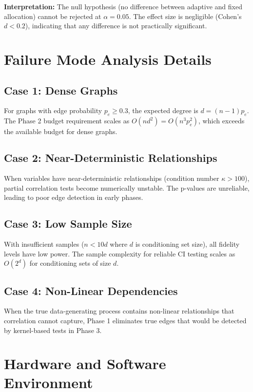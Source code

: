 \documentclass{article}
\begin{document}
\textbf{Interpretation:} The null hypothesis (no difference between adaptive and fixed allocation) cannot be rejected at $\alpha = 0.05$. The effect size is negligible (Cohen's $d < 0.2$), indicating that any difference is not practically significant.

\section{Failure Mode Analysis Details}

\subsection{Case 1: Dense Graphs}

For graphs with edge probability $p_e \geq 0.3$, the expected degree is $d = (n-1)p_e$. The Phase 2 budget requirement scales as $O(nd^2) = O(n^3p_e^2)$, which exceeds the available budget for dense graphs.

\subsection{Case 2: Near-Deterministic Relationships}

When variables have near-deterministic relationships (condition number $\kappa > 100$), partial correlation tests become numerically unstable. The p-values are unreliable, leading to poor edge detection in early phases.

\subsection{Case 3: Low Sample Size}

With insufficient samples ($n < 10d$ where $d$ is conditioning set size), all fidelity levels have low power. The sample complexity for reliable CI testing scales as $O(2^d)$ for conditioning sets of size $d$.

\subsection{Case 4: Non-Linear Dependencies}

When the true data-generating process contains non-linear relationships that correlation cannot capture, Phase 1 eliminates true edges that would be detected by kernel-based tests in Phase 3.

\section{Hardware and Software Environment}
\end{document}
